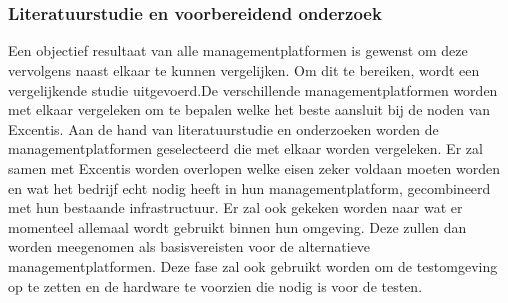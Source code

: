 
\chapter{}%
\label{ch:methodologie}


\subsection{Literatuurstudie en voorbereidend onderzoek}
Een objectief resultaat van alle managementplatformen is gewenst om deze vervolgens naast elkaar te kunnen vergelijken. Om dit te bereiken, wordt een vergelijkende studie uitgevoerd.De verschillende managementplatformen worden met elkaar vergeleken om te bepalen welke het beste aansluit bij de noden van Excentis.
Aan de hand van literatuurstudie en onderzoeken worden de managementplatformen geselecteerd die met elkaar worden vergeleken.
Er zal samen met Excentis worden overlopen welke eisen zeker voldaan moeten worden en wat het bedrijf echt nodig heeft in hun managementplatform, gecombineerd met hun bestaande infrastructuur. Er zal ook gekeken worden naar wat er momenteel allemaal wordt gebruikt binnen hun omgeving. Deze zullen dan worden meegenomen als basisvereisten voor de alternatieve managementplatformen.
Deze fase zal ook gebruikt worden om de testomgeving op te zetten en de hardware te voorzien die nodig is voor de testen.

